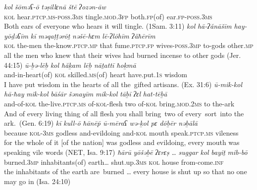 \documentclass[output=paper]{langsci/langscibook}
\begin{document}
\ea%
    \label{ex:doron:51}
    \ea
    \gll \textit{kol}   \textit{šōməʕ-ō}                           \textit{təṣillɛnā}             \textit{štē}               \textit{ʔozən-āw}\\
         \textsc{kol} hear.\textsc{ptcp.ms-poss.3ms}  tingle.\textsc{mod.3fp}  both.\textsc{fp}(of)  ear.\textsc{fp-poss.3ms}  \\
    \glt Both ears of everyone who hears it will tingle. (1Sam. 3:11)
    \ex  
    \gll \textit{kol}   \textit{hā-ʔănāšīm}   \textit{hay-yōḏəʕīm}          \textit{kī}      \textit{məqaṭṭərōṯ}      \textit{nəšē-hɛm}             \textit{lē-ʔlōhīm}  \textit{ʔăħērīm}\\
         \textsc{kol} the-men         the-know.\textsc{ptcp.mp} that  fume.\textsc{ptcp.fp}   wives-\textsc{poss.3mp}  to-gods     other\textsc{.mp}\\
    \glt all the men who knew that their wives had burned incense to other gods (Jer. 44:15)
    \ex  
    \gll \textit{ū-ḇə{}-lēḇ              kol   ħăḵam             lēḇ       nāṯattī           ħoḵmā}\\
         and-in-heart(of) \textsc{kol} skilled.\textsc{ms}(of) heart   have.put.\textsc{1s}  wisdom\\
    \glt I have put wisdom in the hearts of all the~gifted artisans. (Ex. 31:6)
    \ex  
    \gll \textit{ū-mik-kol}    \textit{hā-ħay}                 \textit{mik-kol} \textit{bāśār} \textit{šənayīm} \textit{mik-kol}   \textit{tāḇī} \textit{ʔɛl} \textit{hat-tēḇā} \\
         and-of-\textsc{kol} the-live.\textsc{ptcp.ms} of-\textsc{kol-}flesh   two        of-\textsc{kol}    bring.\textsc{mod.2ms} to the-ark\\
    \glt And of every living thing of all flesh you shall bring~two of every~sort~into the ark.~(Gen. 6:19)
    \ex  
    \gll \textit{kī}            \textit{kull-ō}      \textit{ħānē\={p}    ū-mēraʕ          wə-ḵol     pɛ          dōḇēr                nəḇālā}\\
         because  \textsc{kol-3ms} godless and-evildoing  and-\textsc{kol} mouth  speak.\textsc{ptcp.ms}  vileness\\
    \glt for the whole of it [of the nation] was godless and evildoing, every mouth was speaking vile words (NET, Isa. 9:17)
    \ex  
    \gll \textit{ħārū}             \textit{yōšəḇē}             \textit{ʔɛrɛṣ} \textit{…}  \textit{suggar}           \textit{kol}   \textit{bayiṯ}     \textit{mib-bō}\\
         burned.\textsc{3mp}  inhabitants(of) earth…  shut.up.\textsc{3ms}   \textsc{kol}  house  from-come.\textsc{inf}\\
    \glt the inhabitants of the earth are~burned … every house is shut up so that no one may go in (Isa. 24:10)
    \z
\z
\end{document}
